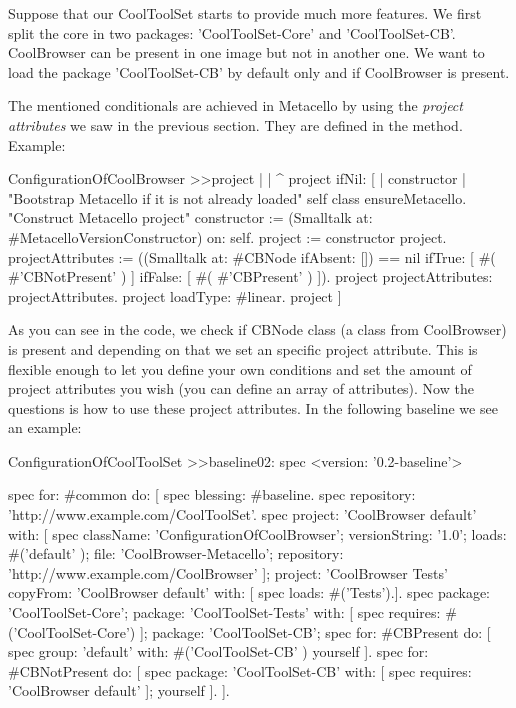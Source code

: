 \documentclass[a4paper,10pt,twoside]{book}
\begin{document}
Suppose that our CoolToolSet starts to provide much more features. We first split the core in two packages: 'CoolToolSet-Core' and 'CoolToolSet-CB'. CoolBrowser can be present in one image but not in another one. We want to load the package 'CoolToolSet-CB' by default only and if CoolBrowser is present. 

The mentioned conditionals are achieved in Metacello by using the \emph{project attributes} we saw in the previous section. They are defined in the  method. 
Example:


\begin{code}{}
ConfigurationOfCoolBrowser >>project
	|  | 
	^ project ifNil: [ | constructor |
		"Bootstrap Metacello if it is not already loaded"
		self class ensureMetacello.
		"Construct Metacello project"
		constructor := (Smalltalk at: #MetacelloVersionConstructor) on: self.
		project := constructor project.
		projectAttributes :=  ((Smalltalk at: #CBNode ifAbsent: []) == nil
			ifTrue: [ #( #'CBNotPresent' ) ]
			ifFalse: [ #( #'CBPresent' ) ]).
		project projectAttributes:  projectAttributes.
		project loadType: #linear.
		project ]

\end{code}

As you can see in the code, we check if CBNode class (a class from CoolBrowser) is present and depending on that we set an specific project attribute.
This is flexible enough to let you define your own conditions and set the amount of project attributes you wish (you can define an array of attributes).  
Now the questions is how to use these project attributes. In the following baseline we see an example:

\begin{code}{}
ConfigurationOfCoolToolSet >>baseline02: spec 
	<version: '0.2-baseline'>
	
	spec for: #common do: [
		spec blessing: #baseline.
		spec repository: 'http://www.example.com/CoolToolSet'.
		spec project: 'CoolBrowser default' with: [
				spec
					className: 'ConfigurationOfCoolBrowser';
					versionString: '1.0';
					loads: #('default' );
					file: 'CoolBrowser-Metacello';
					repository: 'http://www.example.com/CoolBrowser' ];
			project: 'CoolBrowser Tests' 
				copyFrom: 'CoolBrowser default' 
				with: [ spec loads: #('Tests').].
		spec 
			package: 'CoolToolSet-Core';
			package: 'CoolToolSet-Tests' with: [ 
				spec requires: #('CoolToolSet-Core') ];
			package: 'CoolToolSet-CB';			
		spec for: #CBPresent do: [
			spec
				group: 'default' with: #('CoolToolSet-CB' )
				yourself ].
		spec for: #CBNotPresent do: [
			spec 
				package: 'CoolToolSet-CB' with: [ spec requires: 'CoolBrowser default' ];
				yourself ].
			].
		
\end{code}
\end{document}
